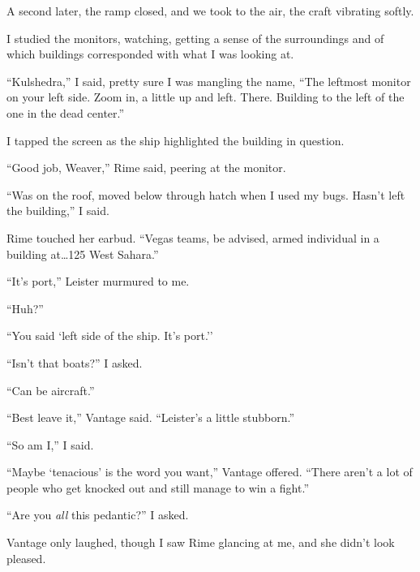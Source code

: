 A second later, the ramp closed, and we took to the air, the craft vibrating softly.



I studied the monitors, watching, getting a sense of the surroundings and of which buildings corresponded with what I was looking at.



``Kulshedra,'' I said, pretty sure I was mangling the name, ``The leftmost monitor on your left side.  Zoom in, a little up and left.  There.  Building to the left of the one in the dead center.''



I tapped the screen as the ship highlighted the building in question.



``Good job, Weaver,'' Rime said, peering at the monitor.



``Was on the roof, moved below through hatch when I used my bugs.  Hasn't left the building,'' I said.



Rime touched her earbud.  ``Vegas teams, be advised, armed individual in a building at\ldots 125 West Sahara.''



``It's port,'' Leister murmured to me.



``Huh?''



``You said `left side of the ship.  It's port.''



``Isn't that boats?'' I asked.



``Can be aircraft.''



``Best leave it,'' Vantage said.  ``Leister's a little stubborn.''



``So am I,'' I said.



``Maybe `tenacious' is the word you want,'' Vantage offered.  ``There aren't a lot of people who get knocked out and still manage to win a fight.''



``Are you \emph{all} this pedantic?''  I asked.



Vantage only laughed, though I saw Rime glancing at me, and she didn't look pleased.



